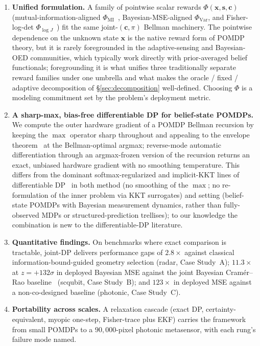 \documentclass[11pt,a4paper,onecolumn]{article}
\newcommand{\bx}{\bm{x}}
\newcommand{\bc}{\bm{c}}
\newcommand{\bs}{\bm{s}}
\begin{document}
\begin{enumerate}[leftmargin=2em]
\item \textbf{Unified formulation.}  A family of pointwise scalar rewards $\Phi(\bx, \bs, \bc)$ (mutual-information-aligned $\Phi_{\text{MI}}$~\cite{lindley1956measure}, Bayesian-MSE-aligned $\Phi_{\text{Var}}$, and Fisher-log-det $\Phi_{\log J}$~\cite{cramer1946mathematical, rao1945information}) fit the same joint-$(\bc, \pi)$ Bellman machinery.  The pointwise dependence on the unknown state $\bx$ is the native reward form of POMDP theory, but it is rarely foregrounded in the adaptive-sensing and Bayesian-OED communities, which typically work directly with prior-averaged belief functionals; foregrounding it is what unifies three traditionally separate reward families under one umbrella and what makes the oracle / fixed / adaptive decomposition of \S\ref{sec:decomposition} well-defined.  Choosing $\Phi$ is a modeling commitment set by the problem's deployment metric.
\item \textbf{A sharp-max, bias-free differentiable DP for belief-state POMDPs.}  We compute the outer hardware gradient of a POMDP Bellman recursion by keeping the $\max$ operator sharp throughout and appealing to the envelope theorem~\cite{milgrom2002envelope, benveniste1979differentiability} at the Bellman-optimal argmax; reverse-mode automatic differentiation through an argmax-frozen version of the recursion returns an exact, unbiased hardware gradient with no smoothing temperature.  This differs from the dominant softmax-regularized and implicit-KKT lines of differentiable DP~\cite{mensch2018differentiable, amos2018mpc, domke2012generic, blondel2022efficient} in both method (no smoothing of the $\max$; no re-formulation of the inner problem via KKT surrogates) and setting (belief-state POMDPs with Bayesian measurement dynamics, rather than fully-observed MDPs or structured-prediction trellises); to our knowledge the combination is new to the differentiable-DP literature.
\item \textbf{Quantitative findings.}  On benchmarks where exact comparison is tractable, joint-DP delivers performance gaps of $2.8\times$ against classical information-bound-guided geometry selection (radar, Case Study~A); $11.3\times$ at $z=+132\sigma$ in deployed Bayesian MSE against the joint Bayesian Cram\'er--Rao baseline~\cite{vantrees2007bayesian, tichavsky1998posterior} (scqubit, Case Study~B); and $123\times$ in deployed MSE against a non-co-designed baseline (photonic, Case Study~C).
\item \textbf{Portability across scales.}  A relaxation cascade (exact DP, certainty-equivalent, myopic one-step, Fisher-trace plus EKF) carries the framework from small POMDPs to a $90{,}000$-pixel photonic metasensor, with each rung's failure mode named.
\end{enumerate}
\end{document}
